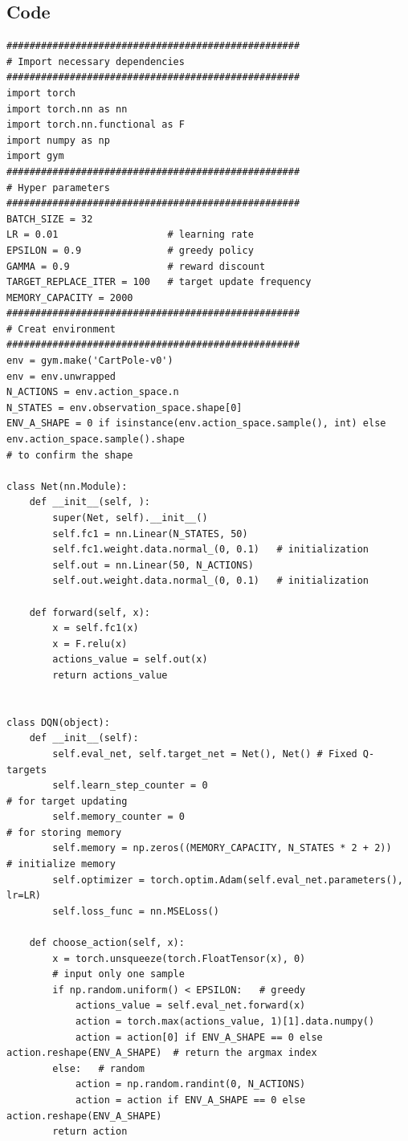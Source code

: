 \documentclass{book}
\begin{document}
\subsection{Code}
\begin{lstlisting}
###################################################
# Import necessary dependencies
###################################################
import torch
import torch.nn as nn
import torch.nn.functional as F
import numpy as np
import gym
###################################################
# Hyper parameters
###################################################
BATCH_SIZE = 32
LR = 0.01                   # learning rate
EPSILON = 0.9               # greedy policy
GAMMA = 0.9                 # reward discount
TARGET_REPLACE_ITER = 100   # target update frequency
MEMORY_CAPACITY = 2000
###################################################
# Creat environment
###################################################
env = gym.make('CartPole-v0')
env = env.unwrapped
N_ACTIONS = env.action_space.n
N_STATES = env.observation_space.shape[0]
ENV_A_SHAPE = 0 if isinstance(env.action_space.sample(), int) else env.action_space.sample().shape     
# to confirm the shape

class Net(nn.Module):
    def __init__(self, ): 
        super(Net, self).__init__()
        self.fc1 = nn.Linear(N_STATES, 50)
        self.fc1.weight.data.normal_(0, 0.1)   # initialization
        self.out = nn.Linear(50, N_ACTIONS)
        self.out.weight.data.normal_(0, 0.1)   # initialization

    def forward(self, x):
        x = self.fc1(x)
        x = F.relu(x)
        actions_value = self.out(x)
        return actions_value


class DQN(object):
    def __init__(self):
        self.eval_net, self.target_net = Net(), Net() # Fixed Q-targets
        self.learn_step_counter = 0                                     # for target updating
        self.memory_counter = 0                                         # for storing memory
        self.memory = np.zeros((MEMORY_CAPACITY, N_STATES * 2 + 2))     # initialize memory
        self.optimizer = torch.optim.Adam(self.eval_net.parameters(), lr=LR)
        self.loss_func = nn.MSELoss()

    def choose_action(self, x):
        x = torch.unsqueeze(torch.FloatTensor(x), 0)
        # input only one sample
        if np.random.uniform() < EPSILON:   # greedy
            actions_value = self.eval_net.forward(x)
            action = torch.max(actions_value, 1)[1].data.numpy()
            action = action[0] if ENV_A_SHAPE == 0 else action.reshape(ENV_A_SHAPE)  # return the argmax index
        else:   # random
            action = np.random.randint(0, N_ACTIONS)
            action = action if ENV_A_SHAPE == 0 else action.reshape(ENV_A_SHAPE)
        return action


\end{lstlisting}
\end{document}
